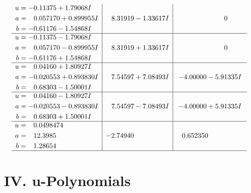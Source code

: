 \documentclass[1p]{elsarticle_modified}
\theoremstyle{definition}
\begin{document}
$$\begin{array}{c|c|c}
\begin{aligned}
u &= -0.11375 + 1.79068 I \\
a &= \phantom{-}0.057170 + 0.899955 I \\
b &= -0.61176 - 1.54868 I\end{aligned}
 & \phantom{-}8.31919 - 1.33617 I & \phantom{-0.000000 } 0 \\ \hline\begin{aligned}
u &= -0.11375 - 1.79068 I \\
a &= \phantom{-}0.057170 - 0.899955 I \\
b &= -0.61176 + 1.54868 I\end{aligned}
 & \phantom{-}8.31919 + 1.33617 I & \phantom{-0.000000 } 0 \\ \hline\begin{aligned}
u &= \phantom{-}0.04160 + 1.80927 I \\
a &= -0.020553 + 0.893830 I \\
b &= \phantom{-}0.68303 - 1.50001 I\end{aligned}
 & \phantom{-}7.54597 + 7.08493 I & -4.00000 - 5.91335 I \\ \hline\begin{aligned}
u &= \phantom{-}0.04160 - 1.80927 I \\
a &= -0.020553 - 0.893830 I \\
b &= \phantom{-}0.68303 + 1.50001 I\end{aligned}
 & \phantom{-}7.54597 - 7.08493 I & -4.00000 + 5.91335 I \\ \hline\begin{aligned}
u &= \phantom{-}0.0498474\phantom{ +0.000000I} \\
a &= \phantom{-}12.3985\phantom{ +0.000000I} \\
b &= \phantom{-}1.28654\phantom{ +0.000000I}\end{aligned}
 & -2.74940\phantom{ +0.000000I} & \phantom{-}0.652350\phantom{ +0.000000I}\\
 \hline 
 \end{array}$$\newpage
\newpage\renewcommand{\arraystretch}{1}
\centering \section*{ IV. u-Polynomials}
\end{document}
